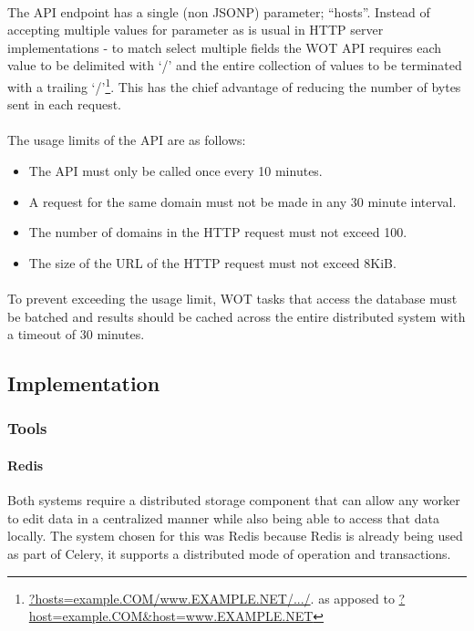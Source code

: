 \paragraph{}
The API endpoint has a single (non JSONP) parameter; ``hosts''. Instead of accepting multiple values for parameter as is usual in HTTP server implementations - to match select multiple fields the WOT API requires each value to be delimited with `/' and the entire collection of values to be terminated with a trailing `/'\footnote{\url{?hosts=example.COM/www.EXAMPLE.NET/.../}. as apposed to \url{?host=example.COM&host=www.EXAMPLE.NET}}.  This has the chief advantage of reducing the number of bytes sent in each request.

\paragraph{}
The usage limits of the API are as follows\cite{wot-about}:

\begin{itemize}
    \item The API must only be called once every 10 minutes.
    \item A request for the same domain must not be made in any 30 minute interval.
    \item The number of domains in the HTTP request must not exceed 100.
    \item The size of the URL of the HTTP request must not exceed 8KiB.
\end{itemize}

\paragraph{}
To prevent exceeding the usage limit, WOT tasks that access the database must be batched and results should be cached across the entire distributed system with a timeout of 30 minutes.


\subsection{Implementation}
\subsubsection{Tools}
\paragraph{Redis}
Both systems require a distributed storage component that can allow any worker to edit data in a centralized manner while also being able to access that data locally. The system chosen for this was Redis\cite{redis} because Redis is already being used as part of Celery, it supports a distributed mode of operation and transactions.

